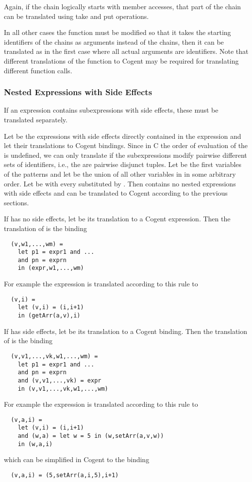 Again, if the chain logically starts with member accesses, that part of the chain can be translated using take and put operations.

In all other cases the function  must be modified so that it takes the starting identifiers of the chains as
arguments instead of the chains, then it can be translated as in the first case where all actual arguments are identifiers.
Note that different translations of the function to Cogent may be required for translating different function calls.

\subsubsection{Nested Expressions with Side Effects}

If an expression contains subexpressions with side effects, these must be translated separately. 

Let  be the expressions with side effects directly contained in the expression  and
let  their translations to Cogent bindings. Since in C the order of evaluation 
of the  is undefined, we can only translate  if the subexpressions
modify pairwise different sets of identifiers, i.e., the  are pairwise disjunct tuples.
Let  be the
first variables of the patterns  and let  be the union of all other variables
in  in some arbitrary order. Let  be  with every 
substituted by . Then  contains no nested expressions with side effects and can be translated
to Cogent according to the previous sections.

If  has no side effects, let  be its translation to a Cogent expression. Then the translation 
of  is the binding
\begin{verbatim}
  (v,w1,...,wm) = 
    let p1 = expr1 and ...
    and pn = exprn 
    in (expr,w1,...,wm)
\end{verbatim}
For example the expression  is translated according to this rule to
\begin{verbatim}
  (v,i) = 
    let (v,i) = (i,i+1)
    in (getArr(a,v),i)
\end{verbatim}

If  has side effects, let  be its translation to a Cogent binding. Then
the translation of  is the binding
\begin{verbatim}
  (v,v1,...,vk,w1,...,wm) = 
    let p1 = expr1 and ...
    and pn = exprn 
    and (v,v1,...,vk) = expr
    in (v,v1,...,vk,w1,...,wm)
\end{verbatim}
For example the expression  is translated according to this rule to
\begin{verbatim}
  (v,a,i) = 
    let (v,i) = (i,i+1)
    and (w,a) = let w = 5 in (w,setArr(a,v,w))
    in (w,a,i)
\end{verbatim}
which can be simplified in Cogent to the binding
\begin{verbatim}
  (v,a,i) = (5,setArr(a,i,5),i+1)
\end{verbatim}

